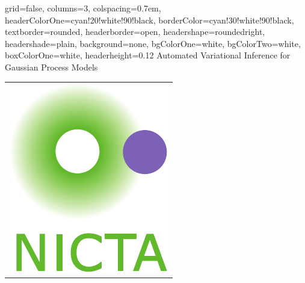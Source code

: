 \documentclass[landscape,a0paper,fontscale=0.292]{baposter}
\begin{document}
\begin{poster}{
 grid=false,
 columns=3,
 colspacing=0.7em,
 headerColorOne=cyan!20!white!90!black,
 borderColor=cyan!30!white!90!black,
textborder=rounded,
 headerborder=open,
 headershape=roundedright,
 headershade=plain,
 background=none,
  bgColorOne=white,
  bgColorTwo=white,
  boxColorOne=white,
 headerheight=0.12\textheight}
 {
 }
 {
 \sc  
	Automated Variational Inference for Gaussian Process Models
 }
  { 
   \vspace{5mm} 
 }
 {
   \begin{tabular}{c}
   \centering
      \includegraphics[height=0.1\textheight]{logo-nicta} \hspace{5mm}

\end{tabular}}
\end{poster}
\end{document}
